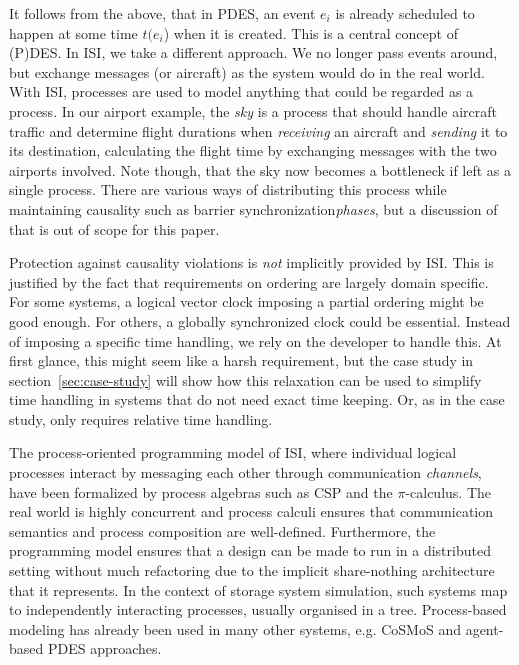 It follows from the above, that in PDES, an event $e_i$ is already scheduled to
happen at some time $t(e_i$) when it is created. This is a central concept of
(P)DES. In ISI, we take a different approach. We no longer pass events around,
but exchange messages (or aircraft) as the system would do in the real world.
With ISI, processes are used to model anything that could be regarded as a
process. In our airport example, the \emph{sky} is a process that should handle
aircraft traffic and determine flight durations when \emph{receiving} an
aircraft and \emph{sending} it to its destination, calculating the flight time
by exchanging messages with the two airports involved. Note though, that the
sky now becomes a bottleneck if left as a single process. There are various
ways of distributing this process while maintaining causality such as barrier
synchronization\emph{phases}\cite{birds}, but a discussion of that
is out of scope for this paper.

Protection against causality violations is \emph{not} implicitly provided by
ISI. This is justified by the fact
that requirements on ordering are largely domain specific. For some systems, a
logical vector clock\cite{lamport-time} imposing a partial ordering might be
good enough. For others, a globally synchronized clock\cite{timewarp} could be
essential. Instead of imposing a specific time handling, we rely on the
developer to handle this. At first glance, this might seem like a harsh
requirement, but the case study in section~\ref{sec:case-study} will show how this relaxation can
be used to simplify time handling in systems that do not need exact time
keeping. Or, as in the case study, only requires relative time handling.

The process-oriented programming model of ISI, where individual logical
processes interact by messaging each other through communication
\emph{channels}, have been formalized by process algebras such as CSP\cite{csp}
and the $\pi$-calculus\cite{pi-calculus}. The real world is highly concurrent
and process calculi ensures that communication semantics and process
composition are well-defined. Furthermore, the programming model ensures that a
design can be made to run in a distributed setting without much refactoring due
to the implicit share-nothing architecture that it represents. In the context
of storage system simulation, such systems map to independently interacting
processes, usually organised in a tree. Process-based modeling has already
been used in many other systems, e.g. CoSMoS\cite{cosmos} and agent-based PDES
approaches\cite{agent-based-pdes}.

